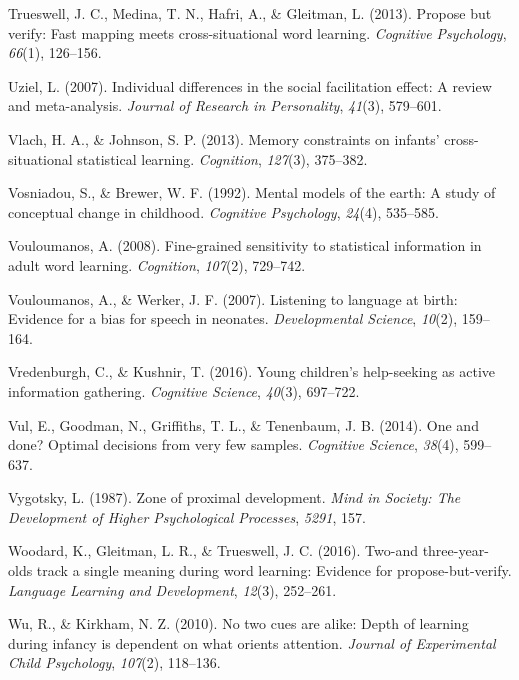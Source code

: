 \documentclass[oneside]{report}
\begin{document}
\hypertarget{ref-trueswell2013propose}{}
Trueswell, J. C., Medina, T. N., Hafri, A., \& Gleitman, L. (2013).
Propose but verify: Fast mapping meets cross-situational word learning.
\emph{Cognitive Psychology}, \emph{66}(1), 126--156.

\hypertarget{ref-uziel2007individual}{}
Uziel, L. (2007). Individual differences in the social facilitation
effect: A review and meta-analysis. \emph{Journal of Research in
Personality}, \emph{41}(3), 579--601.

\hypertarget{ref-vlach2013memory}{}
Vlach, H. A., \& Johnson, S. P. (2013). Memory constraints on infants'
cross-situational statistical learning. \emph{Cognition}, \emph{127}(3),
375--382.

\hypertarget{ref-vosniadou1992mental}{}
Vosniadou, S., \& Brewer, W. F. (1992). Mental models of the earth: A
study of conceptual change in childhood. \emph{Cognitive Psychology},
\emph{24}(4), 535--585.

\hypertarget{ref-vouloumanos2008fine}{}
Vouloumanos, A. (2008). Fine-grained sensitivity to statistical
information in adult word learning. \emph{Cognition}, \emph{107}(2),
729--742.

\hypertarget{ref-vouloumanos2007listening}{}
Vouloumanos, A., \& Werker, J. F. (2007). Listening to language at
birth: Evidence for a bias for speech in neonates. \emph{Developmental
Science}, \emph{10}(2), 159--164.

\hypertarget{ref-vredenburgh2016young}{}
Vredenburgh, C., \& Kushnir, T. (2016). Young children's help-seeking as
active information gathering. \emph{Cognitive Science}, \emph{40}(3),
697--722.

\hypertarget{ref-vul2014}{}
Vul, E., Goodman, N., Griffiths, T. L., \& Tenenbaum, J. B. (2014). One
and done? Optimal decisions from very few samples. \emph{Cognitive
Science}, \emph{38}(4), 599--637.

\hypertarget{ref-vygotsky1987zone}{}
Vygotsky, L. (1987). Zone of proximal development. \emph{Mind in
Society: The Development of Higher Psychological Processes},
\emph{5291}, 157.

\hypertarget{ref-woodard2016two}{}
Woodard, K., Gleitman, L. R., \& Trueswell, J. C. (2016). Two-and
three-year-olds track a single meaning during word learning: Evidence
for propose-but-verify. \emph{Language Learning and Development},
\emph{12}(3), 252--261.

\hypertarget{ref-wu2010no}{}
Wu, R., \& Kirkham, N. Z. (2010). No two cues are alike: Depth of
learning during infancy is dependent on what orients attention.
\emph{Journal of Experimental Child Psychology}, \emph{107}(2),
118--136.
\end{document}
